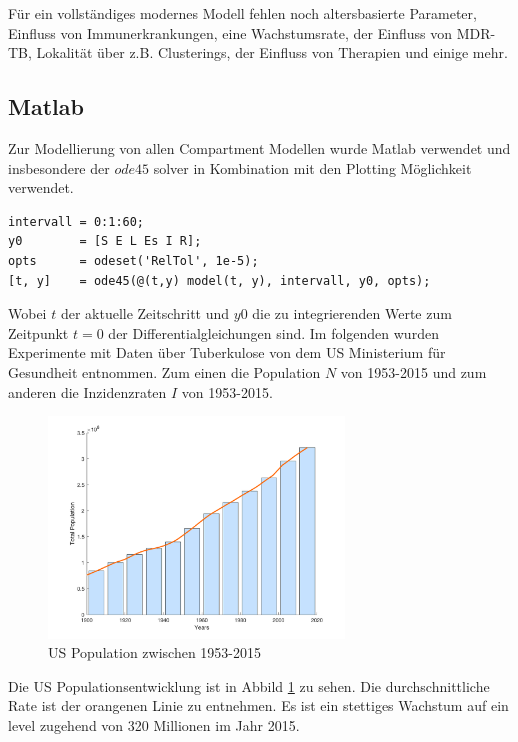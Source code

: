 \documentclass[paper=a4, fontsize=11pt, ngerman, abstract=on]{scrartcl}
\numberwithin{equation}{section} %
\numberwithin{figure}{section} %
\numberwithin{table}{section} %
\begin{document}
Für ein vollständiges modernes Modell fehlen noch altersbasierte Parameter, Einfluss von Immunerkrankungen, eine Wachstumsrate, der Einfluss von MDR-TB, Lokalität über z.B. Clusterings, der Einfluss von Therapien und einige mehr.

\subsection{Matlab}

Zur Modellierung von allen Compartment Modellen wurde Matlab verwendet und insbesondere der $ode45$ solver in Kombination mit den Plotting Möglichkeit verwendet.

\begin{lstlisting}[style=matlab]
intervall = 0:1:60;
y0        = [S E L Es I R];
opts      = odeset('RelTol', 1e-5);
[t, y]    = ode45(@(t,y) model(t, y), intervall, y0, opts);
\end{lstlisting}

Wobei $t$ der aktuelle Zeitschritt und $y0$ die zu integrierenden Werte zum Zeitpunkt $t = 0$ der Differentialgleichungen sind. Im folgenden wurden Experimente mit Daten über Tuberkulose von dem US Ministerium für Gesundheit entnommen. Zum einen die Population $N$ von 1953-2015 und zum anderen die Inzidenzraten $I$ von 1953-2015.

\begin{figure}[ht]
  \centering
  \includegraphics[width=0.7\textwidth,keepaspectratio]{images/us-population}
  \caption{US Population zwischen 1953-2015}
  \label{fig:us-population}
\end{figure}

Die US Populationsentwicklung ist in Abbild \ref{fig:us-population} zu sehen. Die durchschnittliche Rate ist der orangenen Linie zu entnehmen. Es ist ein stettiges Wachstum auf ein level zugehend von 320 Millionen im Jahr 2015.
\end{document}
